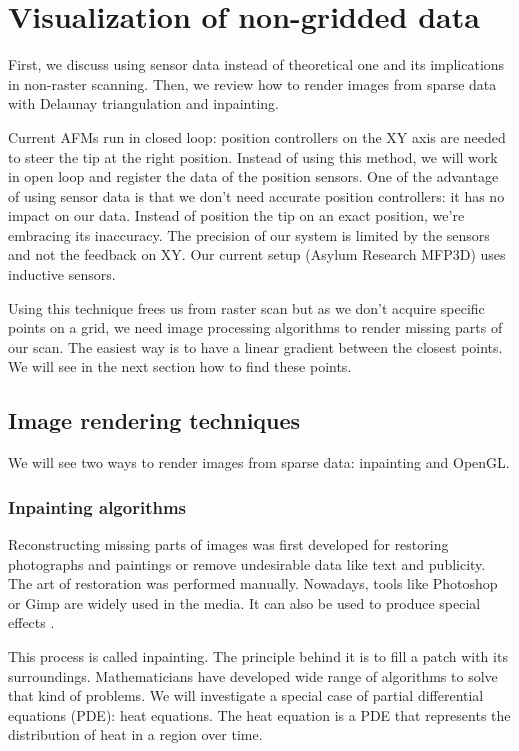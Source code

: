 \chapter{Visualization of non-gridded data}

First, we discuss using sensor data instead of theoretical one and its implications in non-raster scanning. Then, we review how to render images from sparse data with Delaunay triangulation and inpainting. 
 
Current AFMs run in closed loop: position controllers on the XY axis are needed to steer the tip at the right position. Instead of using this method, we will work in open loop and register the data of the position sensors. One of the advantage of using sensor data is that we don't need accurate position controllers: it has no impact on our data. Instead of position the tip on an exact position, we're embracing its inaccuracy. The precision of our system is limited by the sensors and not the feedback on XY. Our current setup (Asylum Research MFP3D) uses inductive sensors.

Using this technique frees us from raster scan but as  we don't acquire specific points on a grid, we need image processing algorithms to render missing parts of our scan.  The easiest way is to have a linear gradient between the closest points. We will see in the next section how to find these points. 

\section{Image rendering techniques}

We will see two ways to render images from sparse data: inpainting and OpenGL.

\subsection{Inpainting algorithms}

Reconstructing missing parts of images was first developed for restoring photographs and paintings or remove undesirable data like text and publicity. The art of restoration was performed manually. Nowadays, tools like Photoshop or Gimp are widely used in the media. It can also be used to produce special effects \cite{richard2001fast}.

This process is called inpainting. The principle behind it is to fill a patch with its surroundings. Mathematicians have developed wide range of algorithms to solve that kind of problems. We will investigate a special case of partial differential equations (PDE): heat equations. 
The heat equation is a PDE that represents the distribution of heat in a region over time. 

